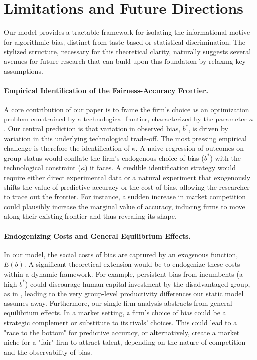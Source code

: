 \section{Limitations and Future Directions}

Our model provides a tractable framework for isolating the informational motive for algorithmic bias, distinct from taste-based or statistical discrimination. The stylized structure, necessary for this theoretical clarity, naturally suggests several avenues for future research that can build upon this foundation by relaxing key assumptions.

\paragraph{Empirical Identification of the Fairness-Accuracy Frontier.}
A core contribution of our paper is to frame the firm's choice as an optimization problem constrained by a technological frontier, characterized by the parameter $\kappa$. Our central prediction is that variation in observed bias, $b^*$, is driven by variation in this underlying technological trade-off. The most pressing empirical challenge is therefore the identification of $\kappa$. A naive regression of outcomes on group status would conflate the firm's endogenous choice of bias ($b^*$) with the technological constraint ($\kappa$) it faces. A credible identification strategy would require either direct experimental data or a natural experiment that exogenously shifts the value of predictive accuracy or the cost of bias, allowing the researcher to trace out the frontier. For instance, a sudden increase in market competition could plausibly increase the marginal value of accuracy, inducing firms to move along their existing frontier and thus revealing its shape.

\paragraph{Endogenizing Costs and General Equilibrium Effects.}
In our model, the social costs of bias are captured by an exogenous function, $E(b)$. A significant theoretical extension would be to endogenize these costs within a dynamic framework. For example, persistent bias from incumbents (a high $b^*$) could discourage human capital investment by the disadvantaged group, as in \citep{CoateLoury1993}, leading to the very group-level productivity differences our static model assumes away. Furthermore, our single-firm analysis abstracts from general equilibrium effects. In a market setting, a firm's choice of bias could be a strategic complement or substitute to its rivals' choices. This could lead to a "race to the bottom" for predictive accuracy, or alternatively, create a market niche for a "fair" firm to attract talent, depending on the nature of competition and the observability of bias.

